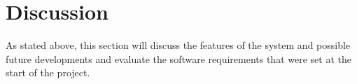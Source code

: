 \section{Discussion}\label{sec:discussion-conclusion}
As stated above, this section will discuss the features of the system and possible future developments and
evaluate the software requirements that were set at the start of the project.




